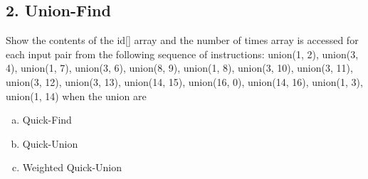 \documentclass{article}\usepackage{amsmath,amssymb,amsthm,tikz,tkz-graph,color,chngpage,soul,hyperref,csquotes,graphicx,floatrow}\newcommand*{\QEDB}{\hfill\ensuremath{\square}}\newtheorem*{prop}{Proposition}\renewcommand{\theenumi}{\alph{enumi}}\usepackage[shortlabels]{enumitem}\usepackage[nobreak=true]{mdframed}\usetikzlibrary{matrix,calc}\MakeOuterQuote{"}\usepackage[margin=0.75in]{geometry} \newtheorem{theorem}{Theorem}
\begin{document}
\subsection*{2. Union-Find}
Show the contents of the id[] array and the number of times array is accessed for each input pair from the following sequence of instructions: union(1, 2), union(3, 4), union(1, 7), union(3, 6), union(8, 9), union(1, 8), union(3, 10), union(3, 11), union(3, 12), union(3, 13), union(14, 15), union(16, 0), union(14, 16), union(1, 3), union(1, 14)  when the union are  
\begin{enumerate}[a.]
\item Quick-Find 
\item Quick-Union
\item Weighted Quick-Union
\end{enumerate}
\end{document}

